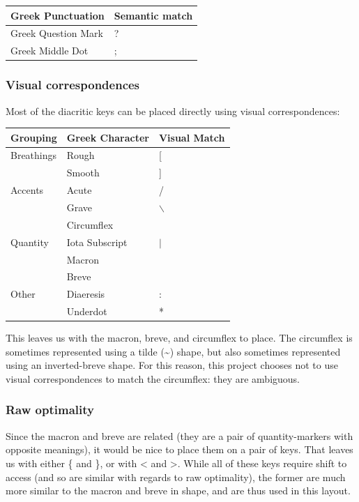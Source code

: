\documentclass[11pt]{article}
\begin{document}
\begin{center}
\begin{tabular}{ll}
Greek Punctuation & Semantic match\\
\hline
Greek Question Mark & ?\\
Greek Middle Dot & ;\\
\end{tabular}
\end{center}

\subsubsection{Visual correspondences}
\label{sec:org546c513}

Most of the diacritic keys can be placed directly using visual correspondences:

\begin{center}
\begin{tabular}{lll}
Grouping & Greek Character & Visual Match\\
\hline
Breathings & Rough & [\\
 & Smooth & ]\\
Accents & Acute & /\\
 & Grave & $\backslash$\\
 & Circumflex & \\
Quantity & Iota Subscript & \(\vert{}\)\\
 & Macron & \\
 & Breve & \\
Other & Diaeresis & :\\
 & Underdot & *\\
\end{tabular}
\end{center}

This leaves us with the macron, breve, and circumflex to place. The circumflex is sometimes represented using a tilde (\textasciitilde{}) shape, but also sometimes represented using an inverted-breve shape. For this reason, this project chooses not to use visual correspondences to match the circumflex: they are ambiguous.

\subsubsection{Raw optimality}
\label{sec:org29cf0cc}

Since the macron and breve are related (they are a pair of quantity-markers with opposite meanings), it would be nice to place them on a pair of keys. That leaves us with either \{ and \}, or with < and >. While all of these keys require shift to access (and so are similar with regards to raw optimality), the former are much more similar to the macron and breve in shape, and are thus used in this layout.
\end{document}
